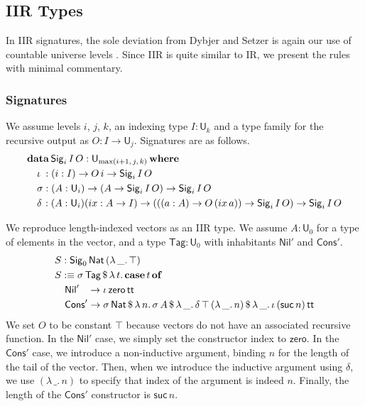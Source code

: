 \documentclass[acmsmall,screen,review,anonymous]{acmart}
\newcommand{\msf}[1]{{\mathsf{#1}}}
\newcommand{\mbf}[1]{{\mathbf{#1}}}
\newcommand{\data}{\mbf{data}}
\newcommand{\U}{\msf{U}}
\newcommand{\where}{\mbf{where}}
\newcommand{\Nat}{\msf{Nat}}
\newcommand{\zero}{\msf{zero}}
\newcommand{\suc}{\msf{suc}}
\newcommand{\Nil}{\msf{Nil}}
\newcommand{\Cons}{\msf{Cons}}
\newcommand{\Sig}{\msf{Sig}}
\newcommand{\Tag}{\msf{Tag}}
\newcommand{\case}{\mbf{case}}
\newcommand{\of}{\mbf{of}}
\newcommand{\ttt}{\msf{tt}}
\newcommand{\ix}{{ix}}
\begin{document}
\subsection{IIR Types}\label{sec:iir}

In IIR signatures, the sole deviation from Dybjer and Setzer is again our use of countable universe
levels \cite{DBLP:journals/jlp/DybjerS06}. Since IIR is quite similar to IR, we present the rules with
minimal commentary.

\subsubsection{Signatures}\label{sec:iir-signatures} We assume levels $i$, $j$, $k$, an indexing type $I : \U_k$ and a type family
for the recursive output as $O : I \to \U_j$. Signatures are as follows.
\begin{alignat*}{4}
  &\data\, \Sig_i\,I\,O : \U_{\max(i+1,\,j,\,k)}\,\where\\
  &\quad \iota\hspace{0.25em}  : (i : I) \to O\,i \to \Sig_i\,I\,O \\
  &\quad \sigma                : (A : \U_i) \to (A \to \Sig_i\,I\,O) \to \Sig_i\,I\,O \\
  &\quad \delta\hspace{0.1em}  : (A : \U_i)(\ix : A \to I) \to (((a : A) \to O\,(\ix\,a)) \to \Sig_i\,I\,O) \to \Sig_i\,I\,O
\end{alignat*}

\begin{example}\label{ex:vector} We reproduce length-indexed vectors as an IIR type. We assume $A : \U_0$ for a type of elements in the vector,
and a type $\Tag : \U_0$ with inhabitants $\Nil'$ and $\Cons'$.
\begin{alignat*}{4}
  & S : \Sig_0\,\Nat\,(\lambda\,\_.\,\top)\\
  & S :\equiv \sigma\,\Tag\,\$\,\lambda\,t.\,\case\,t\,\of \\
  & \quad \Nil'\hspace{0.85em} \to \iota\,\zero\,\ttt \\
  & \quad \Cons'\to \sigma\,\Nat\,\$\,\lambda\,n.\,\sigma\,A\,\$\,\lambda\,\_.\,\delta\,\top\,(\lambda\,\_.\,n)\,\$\,\lambda\,\_.\,\iota\,(\suc\,n)\,\ttt
\end{alignat*}
We set $O$ to be constant $\top$ because vectors do not have an associated recursive function. In
the $\Nil'$ case, we simply set the constructor index to $\zero$. In the $\Cons'$ case, we introduce
a non-inductive argument, binding $n$ for the length of the tail of the vector. Then, when we
introduce the inductive argument using $\delta$, we use $(\lambda\,\_.\,n)$ to specify that index of
the argument is indeed $n$. Finally, the length of the $\Cons'$ constructor is $\suc\,n$.
\end{example}
\end{document}
